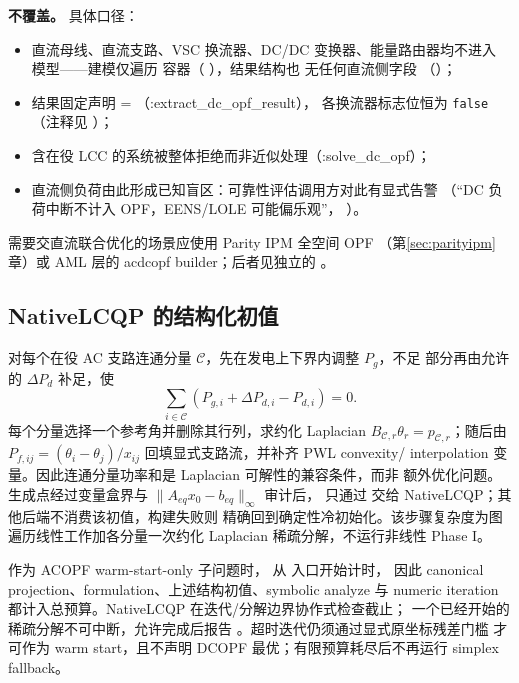 \textbf{不覆盖。} 具体口径：
\begin{itemize}
  \item 直流母线、直流支路、VSC 换流器、DC/DC 变换器、能量路由器均不进入
        模型——建模仅遍历  容器（
        ），结果结构也
        无任何直流侧字段
        （）；
  \item 结果固定声明 =
        （:extract\_dc\_opf\_result）， 各换流器标志位恒为
        \texttt{false}（注释见
        ）；
  \item 含在役 LCC 的系统被整体拒绝而非近似处理（:solve\_dc\_opf）；
  \item 直流侧负荷由此形成已知盲区：可靠性评估调用方对此有显式告警
        （“DC 负荷中断不计入 OPF，EENS/LOLE 可能偏乐观”，
        ）。
\end{itemize}
需要交直流联合优化的场景应使用 Parity IPM 全空间 OPF
（第\ref{sec:parityipm}章）或 AML 层的 acdcopf builder；后者见独立的
。

\subsection{NativeLCQP 的结构化初值}

对每个在役 AC 支路连通分量 $\mathcal C$，先在发电上下界内调整 $P_g$，不足
部分再由允许的 $\Delta P_d$ 补足，使
\begin{equation}
\sum_{i\in\mathcal C}(P_{g,i}+\Delta P_{d,i}-P_{d,i})=0.
\end{equation}
每个分量选择一个参考角并删除其行列，求约化 Laplacian
$B_{\mathcal C,r}\theta_r=p_{\mathcal C,r}$；随后由
$P_{f,ij}=(\theta_i-\theta_j)/x_{ij}$ 回填显式支路流，并补齐 PWL convexity/
interpolation 变量。因此连通分量功率和是 Laplacian 可解性的兼容条件，而非
额外优化问题。生成点经过变量盒界与 $\|A_{eq}x_0-b_{eq}\|_\infty$ 审计后，
只通过  交给 NativeLCQP；其他后端不消费该初值，构建失败则
精确回到确定性冷初始化。该步骤复杂度为图遍历线性工作加各分量一次约化
Laplacian 稀疏分解，不运行非线性 Phase I。

作为 ACOPF warm-start-only 子问题时，
 从  入口开始计时，
因此 canonical projection、formulation、上述结构初值、symbolic analyze 与
numeric iteration 都计入总预算。NativeLCQP 在迭代/分解边界协作式检查截止；
一个已经开始的稀疏分解不可中断，允许完成后报告
。超时迭代仍须通过显式原坐标残差门槛
才可作为 warm start，且不声明 DCOPF 最优；有限预算耗尽后不再运行 simplex
fallback。

